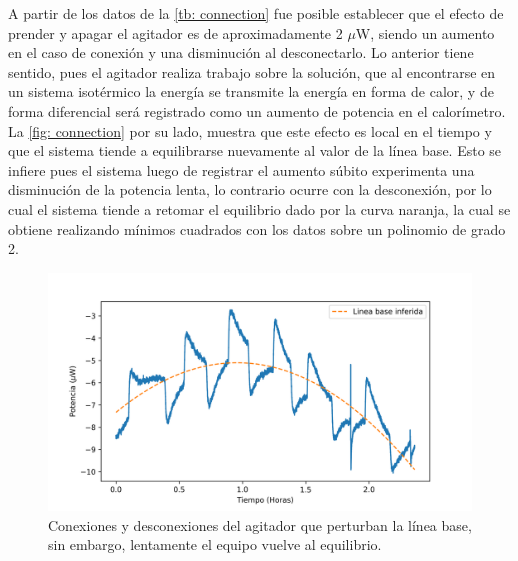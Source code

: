 	A partir de los datos de la \autoref{tb: connection} fue posible establecer que el efecto de prender y apagar el agitador es de aproximadamente 2 $\mu$W, siendo un aumento en el caso de conexión y una disminución al desconectarlo. Lo anterior tiene sentido, pues el agitador realiza trabajo sobre la solución, que al encontrarse en un sistema isotérmico la energía se transmite la energ\'ia en forma de calor, y de forma diferencial será registrado como un aumento de potencia en el calorímetro. La \autoref{fig: connection} por su lado, muestra que este efecto es local en el tiempo y que el sistema tiende a equilibrarse nuevamente al valor de la línea base. Esto se infiere pues el sistema luego de registrar el aumento súbito experimenta una disminución de la potencia lenta, lo contrario ocurre con la desconexión, por lo cual el sistema tiende a retomar el equilibrio dado por la curva naranja, la cual se obtiene realizando mínimos cuadrados con los datos sobre un polinomio de grado 2.
	\begin{figure}[h]
		\centering
		\includegraphics[width=\linewidth]{../Data/Baselines/motor}
		\caption{Conexiones y desconexiones del agitador que perturban la línea base, sin embargo, lentamente el equipo vuelve al equilibrio.}
		\label{fig: connection}
	\end{figure}	